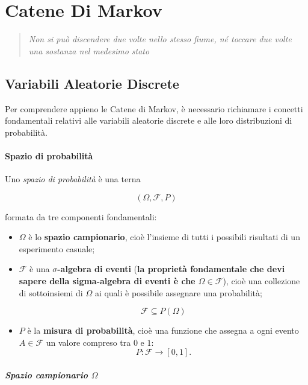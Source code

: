 \chapter{Catene Di Markov}

\begin{quote}
    \itshape Non si può discendere due volte nello stesso fiume, né toccare due volte una sostanza nel medesimo stato
\end{quote}

\section{Variabili Aleatorie Discrete}

Per comprendere appieno le Catene di Markov, è necessario richiamare i concetti fondamentali relativi alle variabili aleatorie discrete e alle loro distribuzioni di probabilità.


\subsubsection{Spazio di probabilità}

Uno \emph{spazio di probabilità} è una terna

$$
(\Omega,\mathcal{F},P)
$$

formata da tre componenti fondamentali:

\begin{itemize}
\item $\Omega$ è lo \textbf{spazio campionario}, cioè l'insieme di tutti i possibili risultati di un esperimento casuale;

\item $\mathcal{F}$ è una \textbf{$\sigma$-algebra di eventi} (\textbf{la proprietà fondamentale che devi sapere della sigma-algebra di eventi è che $\Omega \in \mathcal{F}$}), cioè una collezione di sottoinsiemi di $\Omega$ ai quali è possibile assegnare una probabilità;

\begin{equation}
    \mathcal{F} \subseteq P(\Omega)
\end{equation}

\item $P$ è la \textbf{misura di probabilità}, cioè una funzione che assegna a ogni evento $A\in\mathcal{F}$ un valore compreso tra $0$ e $1$:
\[
P:\mathcal{F}\rightarrow[0,1].
\]

\end{itemize}

\paragraph{Spazio campionario $\Omega$}

